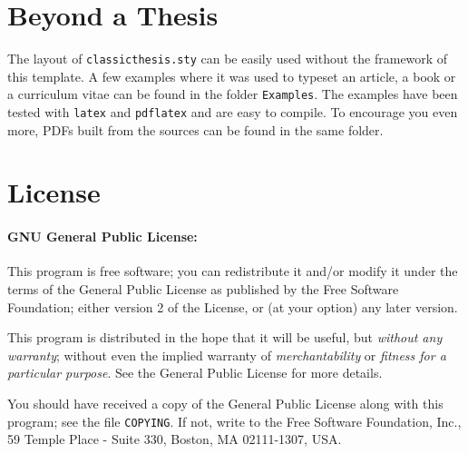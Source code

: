 \section{Beyond a Thesis}
The layout of \texttt{classicthesis.sty} can be easily used without the
framework of this template. A few examples where it was used to typeset 
an article, a book or a curriculum vitae can be found in the folder 
\texttt{Examples}. The examples have been tested with  
\texttt{latex} and \texttt{pdflatex} and are easy to compile. To 
encourage you even more, PDFs built from the sources can be found in the 
same folder. 

%


\section{License}
\paragraph{GNU General Public License:} This program is free software;
you can redistribute it and/or modify
 it under the terms of the  General Public License as
 published by
 the Free Software Foundation; either version 2 of the License, or
 (at your option) any later version.

 This program is distributed in the hope that it will be useful,
 but \emph{without any warranty}; without even the implied warranty of
 \emph{merchant\-ability} or \emph{fitness for a particular purpose}.
 See the
  General Public License for more details.

 You should have received a copy of the  General
 Public License
 along with this program; see the file \texttt{COPYING}.  If not,
 write to
 the Free Software Foundation, Inc., 59 Temple Place - Suite 330,
 Boston, MA 02111-1307, USA.





